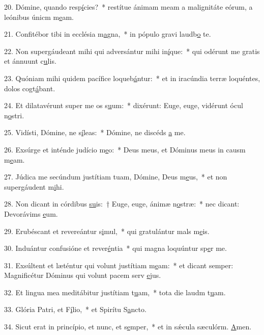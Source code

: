20. Dómine, quando resp\uline{í}cies?~* restítue ánimam meam a malignitáte eórum, a leónibus únicm m\uline{e}am.\par 
21. Confitébor tibi in ecclésia m\uline{a}gna,~* in pópulo gravi laudb\uline{o} te.\par 
22. Non supergáudeant mihi qui adversántur mihi in\uline{í}que:~* qui odérunt me gratis et ánnuunt c\uline{u}lis.\par 
23. Quóniam mihi quidem pacífice loqueb\uline{á}ntur:~* et in iracúndia terræ loquéntes, dolos cogt\uline{á}bant.\par 
24. Et dilatavérunt super me os s\uline{u}um:~* dixérunt: Euge, euge, vidérunt ócul n\uline{o}stri.\par 
25. Vidísti, Dómine, ne s\uline{í}leas:~* Dómine, ne discéds \uline{a} me.\par 
26. Exsúrge et inténde judício m\uline{e}o:~* Deus meus, et Dóminus meus in causm m\uline{e}am.\par 
27. Júdica me secúndum justítiam tuam, Dómine, Deus m\uline{e}us,~* et non supergáudent m\uline{i}hi.\par 
28. Non dicant in córdibus \uline{su}is:~† Euge, euge, ánimæ n\uline{o}stræ:~* nec dicant: Devorávims \uline{e}um.\par 
29. Erubéscant et revereántur s\uline{i}mul,~* qui gratulántur mals m\uline{e}is.\par 
30. Induántur confusióne et rever\uline{é}ntia~* qui magna loquúntur sp\uline{e}r me.\par 
31. Exsúltent et læténtur qui volunt justítiam m\uline{e}am:~* et dicant semper: Magnificétur Dóminus qui volunt pacem serv \uline{e}jus.\par 
32. Et lingua mea meditábitur justítiam t\uline{u}am,~* tota die laudm t\uline{u}am.\par 
33. Glória Patri, et F\uline{í}lio,~* et Spirítu S\uline{a}ncto.\par 
34. Sicut erat in princípio, et nunc, et s\uline{e}mper,~* et in sǽcula sæculórm. \uline{A}men.\par 

